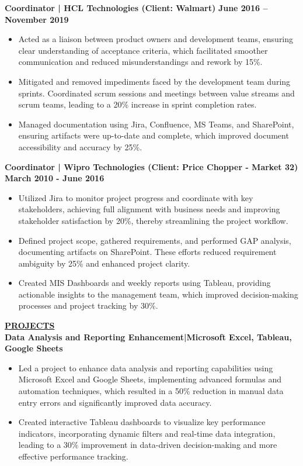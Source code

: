 \documentclass{article}
\begin{document}
\noindent \textbf{Coordinator | HCL Technologies (Client: Walmart)} \hfill \textbf{June 2016 – November 2019}
\begin{itemize}[noitemsep,nolistsep,leftmargin=*]
\item {\small Acted as a liaison between product owners and development teams, ensuring clear understanding of acceptance criteria, which facilitated smoother communication and reduced misunderstandings and rework by 15\%.}
\item {\small Mitigated and removed impediments faced by the development team during sprints. Coordinated scrum sessions and meetings between value streams and scrum teams, leading to a 20\% increase in sprint completion rates.}
\item {\small Managed documentation using Jira, Confluence, MS Teams, and SharePoint, ensuring artifacts were up-to-date and complete, which improved document accessibility and accuracy by 25\%.}
\end{itemize}
\vspace{1mm}

\noindent \textbf{Coordinator | Wipro Technologies (Client: Price Chopper - Market 32)} \hfill \textbf{March 2010 - June 2016}
\begin{itemize}[noitemsep,nolistsep,leftmargin=*]
\item {\small Utilized Jira to monitor project progress and coordinate with key stakeholders, achieving full alignment with business needs and improving stakeholder satisfaction by 20\%, thereby streamlining the project workflow.}
\item {\small Defined project scope, gathered requirements, and performed GAP analysis, documenting artifacts on SharePoint. These efforts reduced requirement ambiguity by 25\% and enhanced project clarity.}
\item {\small Created MIS Dashboards and weekly reports using Tableau, providing actionable insights to the management team, which improved decision-making processes and project tracking by 30\%.}
\end{itemize}

\vspace{2mm}

\noindent \textbf{\underline{PROJECTS}} \\
\textbf{\textbf{Data Analysis and Reporting Enhancement}|Microsoft Excel, Tableau, Google Sheets} 
\begin{itemize}[noitemsep,nolistsep,leftmargin=*]
   \item Led a project to enhance data analysis and reporting capabilities using Microsoft Excel and Google Sheets, implementing advanced formulas and automation techniques, which resulted in a 50\% reduction in manual data entry errors and significantly improved data accuracy.
    \item Created interactive Tableau dashboards to visualize key performance indicators, incorporating dynamic filters and real-time data integration, leading to a 30\% improvement in data-driven decision-making and more effective performance tracking.
\end{itemize}
\end{document}
